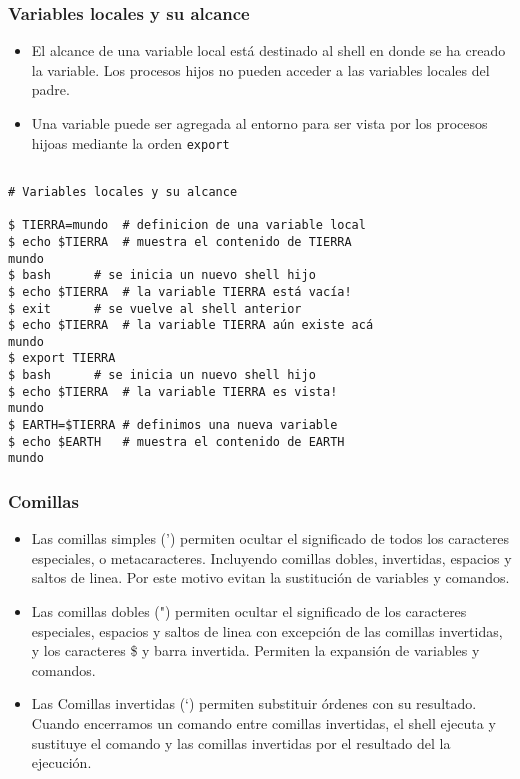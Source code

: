 \documentclass{beamer}
\begin{document}
\begin{frame}{}
\frametitle{Variables locales y su alcance}
\begin{itemize}
\item El alcance de una variable local está destinado al shell en donde se ha creado la variable. Los procesos hijos no pueden acceder a las variables locales del padre.
\item Una variable puede ser agregada al entorno para ser vista por los procesos hijoas mediante la orden \texttt{export}
\end{itemize}
\end{frame}{}

\begin{Verbatim}

# Variables locales y su alcance

$ TIERRA=mundo	# definicion de una variable local
$ echo $TIERRA	# muestra el contenido de TIERRA
mundo
$ bash		# se inicia un nuevo shell hijo
$ echo $TIERRA	# la variable TIERRA está vacía!
$ exit		# se vuelve al shell anterior
$ echo $TIERRA	# la variable TIERRA aún existe acá
mundo
$ export TIERRA
$ bash		# se inicia un nuevo shell hijo
$ echo $TIERRA	# la variable TIERRA es vista!
mundo
$ EARTH=$TIERRA	# definimos una nueva variable
$ echo $EARTH	# muestra el contenido de EARTH
mundo
\end{Verbatim}

\begin{frame}{}
\frametitle{Comillas}
\begin{itemize}
\item Las comillas simples (') permiten ocultar el significado de todos los caracteres 
		especiales, o metacaracteres. Incluyendo comillas dobles, 
		invertidas, espacios y saltos de linea. Por este motivo evitan 
		la sustitución de variables y comandos.
\item Las comillas dobles (") permiten ocultar el significado de los caracteres especiales, 
 		espacios y saltos de linea con excepción de las comillas 
 		invertidas, y los caracteres \$ y barra invertida. Permiten la expansión de variables y comandos.
\item
Las Comillas invertidas (`) permiten substituir órdenes con su resultado.
		Cuando encerramos un comando entre comillas invertidas, el shell 
ejecuta y 
		sustituye el comando y las comillas invertidas por el resultado del 
		la ejecución.
\end{itemize}
\end{frame}{}
\end{document}
